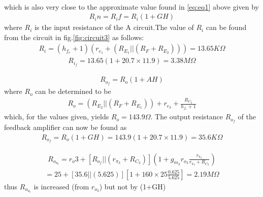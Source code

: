 \begin{enumerate}[label=\thesubsection.\arabic*.,ref=\thesubsection.\theenumi]
\begin{align}
\end{align}
which is also very close to the approximate value found in   \eqref{eq:eq1} above given by
\begin{align}
    R_in =R_if=R_i(1+GH)
\end{align}
where $R_i$ is the input resistance of the A circuit.The value of $R_i$ can be found from the circuit in fig.\ref{fig:circuit3} as follows:
\begin{align}
    R_i=(h_f_e+1)(r_e_1+(R_E_1||(R_F+R_E_2)))=13.65K\Omega
\end{align}
\begin{align}
    R_i_f=13.65(1+20.7\times11.9)=3.38M\Omega
\end{align}

\begin{align}
    R_o_f=R_o(1+AH)
\end{align}
where $R_o$ can be determined to be 
\begin{align}
    R_o=(R_E_2||(R_F+R_E_1))+r_e_3+\frac{R_C_2}{h_f_e+1}
\end{align}
which, for the values given, yields $R_o = 143.9 \Omega$. The output resistance $R_o_f$ of the feedback amplifier can now be found as
\begin{align}
    R_o_f=R_o(1+GH)=143.9(1+20.7\times11.9)=35.6K\Omega
\end{align}

\begin{align}
    R_o_u_t=r_o3+[R_o_f||(r_\pi_3+R_C_2)](1+g_m_3r_o_3\frac{r_\pi_3}{r_\pi_3+R_C_2})
\end{align}
\begin{align}
=25+[35.6||(5.625)][1+160\times25\frac{0.625}{5.625}]=2.19M\Omega \end{align}
thus $R_o_u_t$ is increased (from $r_o_3$) but not by (1+GH)

\end{enumerate}
